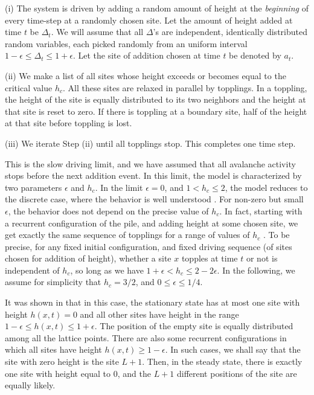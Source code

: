 \documentclass[11pt,a4paper]{book}
\begin{document}
(i) The system is driven by adding a random amount of height at the 
\textit{beginning} of every   time-step at a randomly chosen site. Let the amount 
of height added 
at time $t$ be $\Delta_t$.  We will assume that all $\Delta$'s are 
independent, identically distributed random variables, each picked 
randomly from an uniform interval $1-\epsilon \le \Delta_t \le 
1+\epsilon$. Let the site of addition chosen at time $t$ be denoted by 
$a_t$.

(ii) We make a list of all sites whose height exceeds or becomes equal to 
the critical value $h_c$.  All these sites are relaxed in parallel by 
topplings. In a toppling, the height of the site is equally distributed to its 
two neighbors and the height at that site is reset to zero. If there is 
toppling at a boundary site, half of the height at that site before 
toppling is lost. 

(iii) We iterate Step (ii) until all topplings stop. This completes one 
time step. 

This is the slow driving limit, and we have assumed that all avalanche 
activity stops before the next addition event. In this limit, the model 
is characterized by two parameters $\epsilon$ and $h_c$. In the limit 
$\epsilon =0$, and $1 < h_c \le 2$, the model reduces to the discrete 
case, where the behavior is well understood \cite{ruelle}. For non-zero 
but small $\epsilon$, the behavior does not depend on the precise value 
of $h_c$. In fact, starting with a recurrent configuration of the pile, 
and adding height at some chosen site, we get exactly the same sequence 
of topplings for a range of values of $h_c$ \cite{redig}. To be precise, 
for any fixed initial configuration, and fixed driving sequence (of 
sites chosen for addition of height), whether a site $x$ topples at time 
$t$ or not is independent of $h_c$, so long as we have $1 + \epsilon < 
h_c \le 2 -2 \epsilon$. In the following, we assume for simplicity that 
$h_c = 3/2$, and $0 \leq \epsilon \le 1/4$.

 It was shown in \cite{redig} that in this case, the stationary state has at 
most one site with height $h(x,t)=0$ and all other sites have height in the 
range $ 1 -\epsilon \le h(x,t) \le 1 +\epsilon$. The position of the empty site 
is equally distributed among all the lattice points. There are also some 
recurrent configurations in which all sites have height $h(x,t) \geq 1 - \epsilon$.   
In such cases, we shall say that the site with zero height is the site 
$L+1$.  Then, in the steady state, there is exactly one site with height equal to $0$, and the 
$L+1$ different positions of the site are equally likely.
\end{document}
